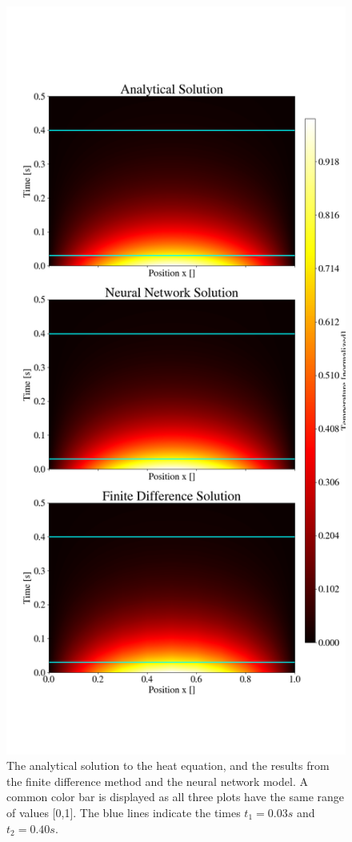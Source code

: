 \subsubsection{}
\begin{figure}[h!]
    \centering
    \includegraphics[width=1.0\linewidth]{project_3/plots/heat_map_comparison.png}
    \caption{The analytical solution to the heat equation, and the results from the finite difference method and the neural network model. A common color bar is displayed as all three plots have the same range of values [0,1]. The blue lines indicate the times $t_1 = 0.03 s$ and $t_2 = 0.40 s$.}
    \label{fig:heatmaps}
\end{figure}

